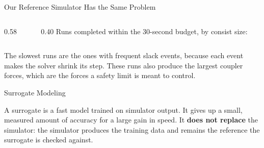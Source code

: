 \begin{frame}{Our Reference Simulator Has the Same Problem}
  \vspace{-0.2em}
  \begin{columns}[T,onlytextwidth]
    \begin{column}{0.58\textwidth}
      \benchRegimeChart
      \vspace{-0.2em}
      \centering\benchLegend
    \end{column}
    \begin{column}{0.40\textwidth}
      \vspace{0.2em}
      {\small Runs completed within the 30-second budget, by consist size:}
      \vspace{0.5em}

      \begin{center}
        \vspace{0.45em}
        \vspace{0.45em}
      \end{center}
    \end{column}
  \end{columns}

  \vspace{0.1em}
  \begin{minipage}{0.95\textwidth}\scriptsize
    The slowest runs are the ones with frequent slack events, because each event
    makes the solver shrink its step. These runs also produce the largest coupler
    forces, which are the forces a safety limit is meant to control.
  \end{minipage}
\end{frame}

\begin{frame}{Surrogate Modeling}
  \vspace{0.8em}
  \centering
  \scalebox{0.86}{\surrogateFlow}

  \vspace{1.4em}
  \begin{minipage}{0.90\textwidth}\small
    A surrogate is a fast model trained on simulator output. It gives up a small,
    measured amount of accuracy for a large gain in speed. It \textbf{does not
    replace} the simulator: the simulator produces the training data and remains
    the reference the surrogate is checked against.
  \end{minipage}
\end{frame}

